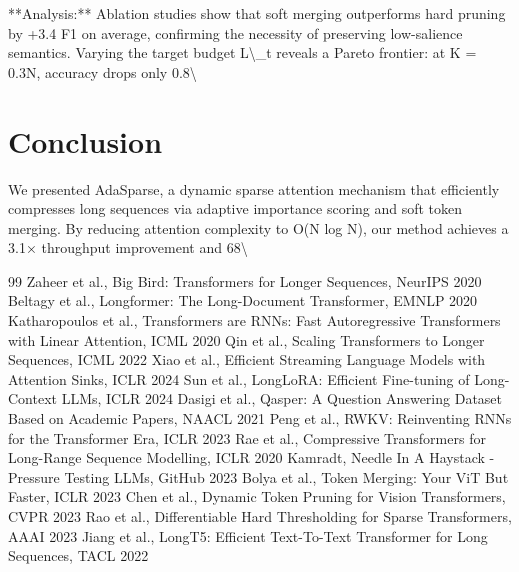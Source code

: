 \documentclass[11pt,a4paper]{article}
\begin{document}
**Analysis:** Ablation studies show that soft merging outperforms hard pruning by +3.4 F1 on average, confirming the necessity of preserving low-salience semantics. Varying the target budget L\textbackslash{}_t reveals a Pareto frontier: at K = 0.3N, accuracy drops only 0.8\textbackslash{}%

\section{Conclusion}
We presented AdaSparse, a dynamic sparse attention mechanism that efficiently compresses long sequences via adaptive importance scoring and soft token merging. By reducing attention complexity to O(N log N), our method achieves a 3.1× throughput improvement and 68\textbackslash{}%


\begin{thebibliography}{99}
 Zaheer et al., Big Bird: Transformers for Longer Sequences, NeurIPS 2020
 Beltagy et al., Longformer: The Long-Document Transformer, EMNLP 2020
 Katharopoulos et al., Transformers are RNNs: Fast Autoregressive Transformers with Linear Attention, ICML 2020
 Qin et al., Scaling Transformers to Longer Sequences, ICML 2022
 Xiao et al., Efficient Streaming Language Models with Attention Sinks, ICLR 2024
 Sun et al., LongLoRA: Efficient Fine-tuning of Long-Context LLMs, ICLR 2024
 Dasigi et al., Qasper: A Question Answering Dataset Based on Academic Papers, NAACL 2021
 Peng et al., RWKV: Reinventing RNNs for the Transformer Era, ICLR 2023
 Rae et al., Compressive Transformers for Long-Range Sequence Modelling, ICLR 2020
 Kamradt, Needle In A Haystack - Pressure Testing LLMs, GitHub 2023
 Bolya et al., Token Merging: Your ViT But Faster, ICLR 2023
 Chen et al., Dynamic Token Pruning for Vision Transformers, CVPR 2023
 Rao et al., Differentiable Hard Thresholding for Sparse Transformers, AAAI 2023
 Jiang et al., LongT5: Efficient Text-To-Text Transformer for Long Sequences, TACL 2022
\end{thebibliography}
\end{document}
